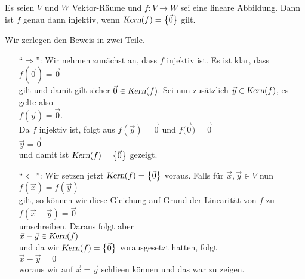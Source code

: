 \begin{Satz}
  Es seien $V$ und $W$ Vektor-R\"{a}ume und $f:V \rightarrow W$ sei eine lineare Abbildung.
  Dann ist $f$ genau dann injektiv, wenn $\textsl{Kern}(f) = \bigl\{ \vec{0} \bigr\}$ gilt.
\end{Satz}

\proof
Wir zerlegen den Beweis in zwei Teile.
\begin{enumerate}
\item[``$\Rightarrow$'':] Wir nehmen zun\"{a}chst an, dass $f$ injektiv ist.  Es ist klar, dass
      \\[0.2cm]
      \hspace*{1.3cm}
      $f(\vec{0}) = \vec{0}$
      \\[0.2cm]
      gilt und damit gilt sicher $\vec{0} \in \textsl{Kern}(f)$.  Sei nun zus\"{a}tzlich $\vec{y} \in \textsl{Kern}(f)$, es
      gelte also 
      \\[0.2cm]
      \hspace*{1.3cm}
      $f(\vec{y}) = \vec{0}$.
      \\[0.2cm]
      Da $f$ injektiv ist, folgt aus $f(\vec{y}) = \vec{0}$ und $f\bigl(\vec{0}\bigr) = \vec{0}$
      \\[0.2cm]
      \hspace*{1.3cm}
      $\vec{y} = \vec{0}$
      \\[0.2cm]
      und damit ist $\textsl{Kern}(f) = \bigl\{ \vec{0} \bigr\}$ gezeigt.
\item[``$\Leftarrow$'':] Wir setzen jetzt $\textsl{Kern}(f) = \bigl\{ \vec{0} \bigr\}$ voraus.  Falls f\"{u}r $\vec{x}, \vec{y} \in V$
      nun
      \\[0.2cm]
      \hspace*{1.3cm}
      $f(\vec{x}) = f(\vec{y})$
      \\[0.2cm]
      gilt, so k\"{o}nnen wir diese Gleichung auf Grund der Linearit\"{a}t von $f$ zu
      \\[0.2cm]
      \hspace*{1.3cm}
      $f(\vec{x} - \vec{y}) = \vec{0}$
      \\[0.2cm]
      umschreiben.  Daraus folgt aber
      \\[0.2cm]
      \hspace*{1.3cm}
      $\vec{x} - \vec{y} \in \textsl{Kern}(f)$
      \\[0.2cm]
      und da wir $\textsl{Kern}(f) = \bigl\{ \vec{0} \bigr\}$ vorausgesetzt hatten, folgt
      \\[0.2cm]
      \hspace*{1.3cm}
      $\vec{x} - \vec{y} = 0$
      \\[0.2cm]
      woraus wir auf $\vec{x} = \vec{y}$ schlie\3en k\"{o}nnen und das war zu zeigen.  \qeds
\end{enumerate}


